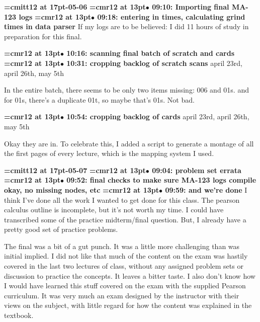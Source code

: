 {\medskip\noindent\bf\font\titlefont=cmitt12 at 17pt-05-06}\medskip
{\smallskip\noindent\bf\font\titlefont=cmr12 at 13pt\titlefont $\bullet$ 09:10: Importing final MA-123 logs}\smallskip
{\smallskip\noindent\bf\font\titlefont=cmr12 at 13pt\titlefont $\bullet$ 09:18: entering in times, calculating grind times in data parser}\smallskip
If my logs are to be believed: I did 11 hours of study in preparation for this final.
\par

{\smallskip\noindent\bf\font\titlefont=cmr12 at 13pt\titlefont $\bullet$ 10:16: scanning final batch of scratch and cards}\smallskip
{\smallskip\noindent\bf\font\titlefont=cmr12 at 13pt\titlefont $\bullet$ 10:31: cropping backlog of scratch scans}\smallskip
april 23rd, april 26th, may 5th
\par

In the entire batch, there seems to be only two items missing: 006 and 01s. and for 01s, there's a duplicate 01t, so maybe that's 01s. Not bad.
\par

{\smallskip\noindent\bf\font\titlefont=cmr12 at 13pt\titlefont $\bullet$ 10:54: cropping backlog of cards}\smallskip
april 23rd, april 26th, may 5th
\par

Okay they are in. To celebrate this, I added a script to generate a montage of all the first pages of every lecture, which is the mapping system I used.
\par

{\medskip\noindent\bf\font\titlefont=cmitt12 at 17pt-05-07}\medskip
{\smallskip\noindent\bf\font\titlefont=cmr12 at 13pt\titlefont $\bullet$ 09:04: problem set errata}\smallskip
{\smallskip\noindent\bf\font\titlefont=cmr12 at 13pt\titlefont $\bullet$ 09:52: final checks to make sure MA-123 logs compile okay, no missing nodes, etc}\smallskip
{\smallskip\noindent\bf\font\titlefont=cmr12 at 13pt\titlefont $\bullet$ 09:59: and we're done}\smallskip
I think I've done all the work I wanted to get done for this class. The pearson calculus outline is incomplete, but it's not worth my time. I could have transcribed some of the practice midterm/final question. But, I already have a pretty good set of practice problems.
\par

The final was a bit of a gut punch. It was a little more challenging than was initial implied. I did not like that much of the content on the exam was hastily covered in the last two lectures of class, without any assigned problem sets or discussion to practice the concepts. It leaves a bitter taste. I also don't know how I would have learned this stuff covered on the exam with the supplied Pearson curriculum. It was very much an exam designed by the instructor with their views on the subject, with little regard for how the content was explained in the textbook.
\par

